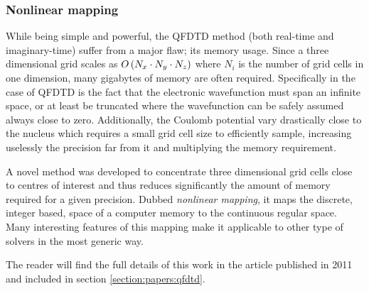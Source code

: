 \subsubsection{Nonlinear mapping}
\label{section:tools:qfdtd:mapping}

While being simple and powerful, the QFDTD method (both real-time and
imaginary-time) suffer from a major flaw; its memory usage. Since a three
dimensional grid scales as $O\left( N_x \cdot N_y \cdot N_z \right)$ where $N_i$ is the
number of grid cells in one dimension, many gigabytes of memory are often
required. Specifically in the case of QFDTD is the fact that the electronic
wavefunction must span an infinite space, or at least be truncated where
the wavefunction can be safely assumed always close to zero. Additionally,
the Coulomb potential vary drastically close to the nucleus which requires
a small grid cell size to efficiently sample, increasing uselessly the precision
far from it and multiplying the memory requirement.

A novel method was developed to concentrate three dimensional grid cells close
to centres of interest and thus reduces significantly the amount of memory
required for a given precision. Dubbed \textit{nonlinear mapping}, it maps the
discrete, integer based, space of a computer memory to the continuous regular
space. Many interesting features of this mapping make it applicable to other
type of solvers in the most generic way.

The reader will find the full details of this work in the article published
in 2011 and included in section \ref{section:papers:qfdtd}.


